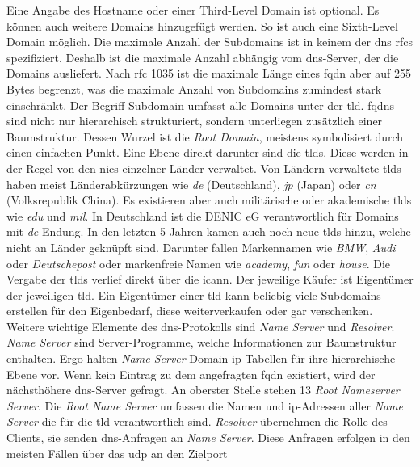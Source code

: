 \documentclass[titlepage]{report}
\begin{document}
Eine Angabe des Hostname oder einer Third-Level
Domain ist optional. Es können auch weitere Domains hinzugefügt werden.
So ist auch eine Sixth-Level Domain möglich. Die maximale Anzahl der
Subdomains ist in keinem der \gls{dns} \glspl{rfc} spezifiziert. Deshalb
ist die maximale Anzahl abhängig vom \gls{dns}\hyp{}Server, der die
Domains ausliefert. Nach \gls{rfc} 1035 ist die maximale Länge eines
\gls{fqdn} aber auf 255 Bytes begrenzt\cite[siehe Section
2.3.4]{RFC1035}, was die maximale Anzahl von Subdomains zumindest stark
einschränkt. Der Begriff Subdomain umfasst alle Domains unter der
\gls{tld}. \glspl{fqdn} sind nicht nur hierarchisch strukturiert, sondern
unterliegen zusätzlich einer Baumstruktur. Dessen Wurzel ist die
\emph{Root Domain}, meistens symbolisiert durch einen einfachen Punkt.
Eine Ebene direkt darunter sind die \glspl{tld}. Diese
werden in der Regel von den \glspl{nic} einzelner Länder verwaltet. Von
Ländern verwaltete \glspl{tld} haben meist Länderabkürzungen wie
\emph{de} (Deutschland), \emph{jp} (Japan) oder \emph{cn} (Volksrepublik
China). Es existieren aber auch militärische oder akademische
\glspl{tld} wie \emph{edu} und \emph{mil}. In Deutschland ist die DENIC eG
verantwortlich für Domains mit \emph{de}\hyp{}Endung.
In den letzten 5 Jahren kamen auch noch neue \glspl{tld} hinzu, welche
nicht an Länder geknüpft sind. Darunter fallen Markennamen wie
\emph{BMW}, \emph{Audi} oder \emph{Deutschepost} oder markenfreie Namen
wie \emph{academy}, \emph{fun} oder \emph{house}\cite{NEWTLDLIST}. Die
Vergabe der \glspl{tld} verlief direkt über die \gls{icann}. Der jeweilige
Käufer ist Eigentümer der jeweiligen \gls{tld}. Ein Eigentümer
einer \gls{tld} kann beliebig viele Subdomains erstellen für den
Eigenbedarf, diese weiterverkaufen oder gar verschenken. Weitere
wichtige Elemente des \gls{dns}\hyp{}Protokolls sind \emph{Name Server}
und \emph{Resolver}\cite[Siehe Section 2.4]{RFC1034}.
\emph{Name Server} sind Server\hyp{}Programme, welche
Informationen zur Baumstruktur enthalten. Ergo halten \emph{Name
Server} Domain\hyp{}\gls{ip}\hyp{}Tabellen für ihre
hierarchische Ebene vor. Wenn kein Eintrag zu dem angefragten \gls{fqdn}
existiert, wird der nächsthöhere \gls{dns}\hyp{}Server gefragt. An
oberster Stelle stehen 13 \emph{Root Nameserver
Server}\cite{ROOTNAMESERVER}. Die \emph{Root
Name Server} umfassen die Namen und \gls{ip}\hyp{}Adressen aller
\emph{Name Server} die für die \gls{tld} verantwortlich sind.
\emph{Resolver} übernehmen die Rolle des Clients, sie senden
\gls{dns}\hyp{}Anfragen an \emph{Name Server}. Diese
Anfragen erfolgen in den meisten Fällen über das \gls{udp} an den Zielport
\end{document}
